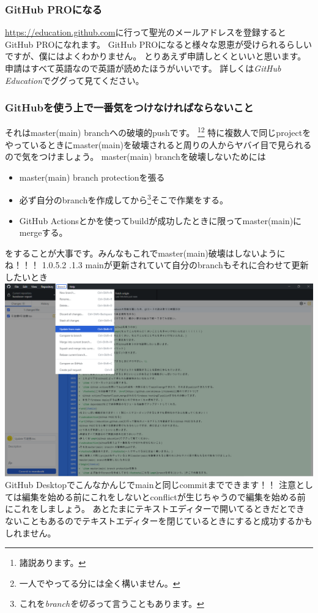 \documentclass[dvipdfmx,jb5]{jarticle}
\makeatletter
\newcommand{\subsubsubsection}{\@startsection{paragraph}{4}{\z@}%
    {1.0\Cvs \@plus.5\Cdp \@minus.2\Cdp}%
    {.1\Cvs \@plus.3\Cdp}%
    {\reset@font}
  }
\makeatother
\begin{document}
\subsubsection{GitHub PROになる}
\url{https://education.github.com}に行って聖光のメールアドレスを登録するとGitHub PROになれます。
GitHub PROになると様々な恩恵が受けられるらしいですが、僕にはよくわかりません。
とりあえず申請しとくといいと思います。
申請はすべて英語なので英語が読めたほうがいいです。
詳しくは\emph{GitHub Education}でググって見てください。
\subsubsection{GitHubを使う上で一番気をつけなければならないこと}
それはmaster(main) branchへの破壊的pushです。
\footnote{諸説あります。}\footnote{一人でやってる分には全く構いません。}
特に複数人で同じprojectをやっているときにmaster(main)を破壊されると周りの人からヤバイ目で見られるので気をつけましょう。
master(main) branchを破壊しないためには
\begin{itemize}
  \item master(main) branch protectionを張る
  \item 必ず自分のbranchを作成してから\footnote{これを\emph{branchを切る}って言うこともあります。}そこで作業をする。
  \item GitHub Actionsとかを使ってbuildが成功したときに限ってmaster(main)にmergeする。
\end{itemize}
をすることが大事です。みんなもこれでmaster(main)破壊はしないようにね！！！
\subsubsubsection{mainが更新されていて自分のbranchもそれに合わせて更新したいとき}
\includegraphics[width=15cm]{assets/update-branch.png}\\
GitHub Desktopでこんなかんじでmainと同じcommitまでできます！！
注意としては編集を始める前にこれをしないとconflictが生じちゃうので編集を始める前にこれをしましょう。
あとたまにテキストエディターで開いてるときだとできないこともあるのでテキストエディターを閉じているときにすると成功するかもしれません。
\end{document}
